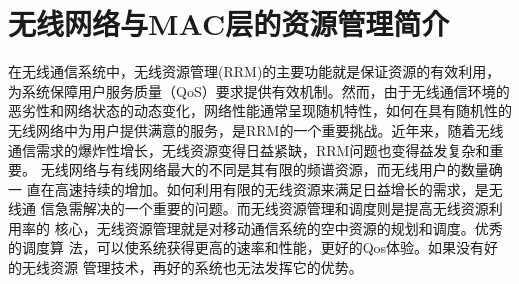\chapter{无线网络与MAC层的资源管理简介}
\label{chap_brief}
在无线通信系统中，无线资源管理(RRM)的主要功能就是保证资源的有效利用，为系统保障用户服务质量（QoS）要求提供有效机制。然而，由于无线通信环境的恶劣性和网络状态的动态变化，网络性能通常呈现随机特性，如何在具有随机性的无线网络中为用户提供满意的服务，是RRM的一个重要挑战。近年来，随着无线通信需求的爆炸性增长，无线资源变得日益紧缺，RRM问题也变得益发复杂和重要。
无线网络与有线网络最大的不同是其有限的频谱资源，而无线用户的数量确一
直在高速持续的增加。如何利用有限的无线资源来满足日益增长的需求，是无线通
信急需解决的一个重要的问题。而无线资源管理和调度则是提高无线资源利用率的
核心，无线资源管理就是对移动通信系统的空中资源的规划和调度。优秀的调度算
法，可以使系统获得更高的速率和性能，更好的Qos体验。如果没有好的无线资源
管理技术，再好的系统也无法发挥它的优势。

